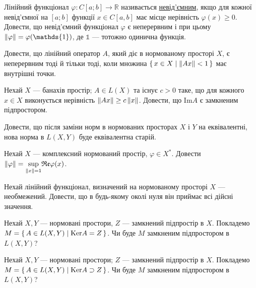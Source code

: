 
\begin{exercise}
    Лінійний функціонал $\varphi: C[a; b] \rightarrow \mathbb{R}$ називається \underline{невід'ємним},
    якщо для кожної невід'ємної на $[a; b]$ функції $x \in C[a, b]$ має місце нерівність 
    $\varphi(x) \geq 0$. Довести, що невід'ємний функціонал $\varphi$ є неперервним і при цьому
    $\norm{\varphi} = \varphi(\mathds{1})$, де $\mathds{1}$ --- тотожно одинична функція.
\end{exercise}

\begin{exercise}
    Довести, що лінійний оператор $A$, який діє в нормованому просторі $X$, є неперервним тоді
    й тільки тоді, коли множина $\set{x \in X \mid \left\lVert Ax\right\rVert < 1}$ має внутрішні точки.
\end{exercise}

\begin{exercise}
    Нехай $X$ --- банахів простір; $A \in L(X)$ та існує $c > 0$ таке, що для кожного $x \in X$
    виконується нерівність $\left\lVert Ax\right\rVert \geq c \left\lVert x\right\rVert$. Довести, що $\mathrm{Im} A$ є замкненим підпростором.
\end{exercise}

\begin{exercise}
    Довести, що після заміни норм в нормованих просторах $X$ і $Y$ на еквівалентні,
    нова норма в $L\left( X, Y\right)$ буде еквівалентна старій.
\end{exercise}

\begin{exercise}
    Нехай $X$ --- комплексний нормований простір, $\varphi \in X^*$. Довести $\left\lVert\varphi\right\rVert = \underset{\left\lVert x\right\rVert=1}{\sup}\mathfrak{Re}\varphi(x)$.
\end{exercise}

\begin{exercise}
    Нехай лінійний функціонал, визначений на нормованому просторі  $X$ --- необмежений.
    Довести, що в будь-якому околі нуля він приймає всі дійсні значення.
\end{exercise}

\begin{exercise}
    Нехай $X,Y$ --- нормовані простори, $Z$ --- замкнений підпростір в $X$. Покладемо 
    $M = \set{A \in L(X,Y) \mid \mathrm{Ker} A = Z}$. Чи буде $M$ замкненим підпростором в $L\left( X, Y\right)$?
\end{exercise}

\begin{exercise}
    Нехай $X,Y$ --- нормовані простори; $Z$ --- замкнений підпростір в $X$. Покладемо 
    $M = \set{A \in L(X,Y) \mid \mathrm{Ker} A \supset Z}$. Чи буде $M$ замкненим підпростором в $L\left( X, Y\right)$?
\end{exercise}

